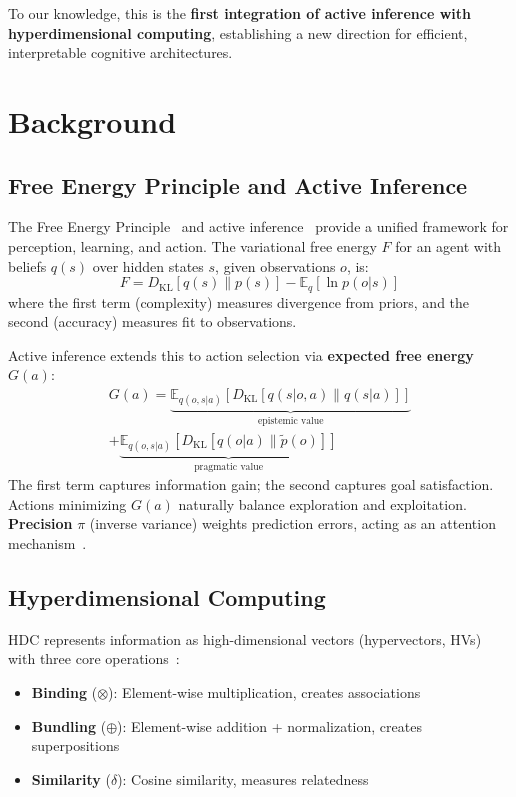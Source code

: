\documentclass[10pt,letterpaper]{article}
\begin{document}
To our knowledge, this is the \textbf{first integration of active inference with hyperdimensional computing}, establishing a new direction for efficient, interpretable cognitive architectures.


\section{Background}

\subsection{Free Energy Principle and Active Inference}

The Free Energy Principle~\cite{friston2010free} and active inference~\cite{parr2022active} provide a unified framework for perception, learning, and action.
The variational free energy $F$ for an agent with beliefs $q(s)$ over hidden states $s$, given observations $o$, is:
\begin{equation}
F = D_{\mathrm{KL}}[q(s) \| p(s)] - \mathbb{E}_q[\ln p(o|s)]
\label{eq:free-energy}
\end{equation}
where the first term (complexity) measures divergence from priors, and the second (accuracy) measures fit to observations.

Active inference extends this to action selection via \textbf{expected free energy} $G(a)$:
\begin{multline}
G(a) = \underbrace{\mathbb{E}_{q(o,s|a)}[D_{\mathrm{KL}}[q(s|o,a) \| q(s|a)]]}_{\text{epistemic value}} \\
  + \underbrace{\mathbb{E}_{q(o,s|a)}[D_{\mathrm{KL}}[q(o|a) \| \tilde{p}(o)]]}_{\text{pragmatic value}}
\label{eq:efe}
\end{multline}
The first term captures information gain; the second captures goal satisfaction.
Actions minimizing $G(a)$ naturally balance exploration and exploitation.
\textbf{Precision} $\pi$ (inverse variance) weights prediction errors, acting as an attention mechanism~\cite{feldman2010attention}.

\subsection{Hyperdimensional Computing}

HDC represents information as high-dimensional vectors (hypervectors, HVs) with three core operations~\cite{kanerva2009hyperdimensional}:
\begin{itemize}[nosep]
  \item \textbf{Binding} ($\otimes$): Element-wise multiplication, creates associations
  \item \textbf{Bundling} ($\oplus$): Element-wise addition + normalization, creates superpositions
  \item \textbf{Similarity} ($\delta$): Cosine similarity, measures relatedness
\end{itemize}
\end{document}

